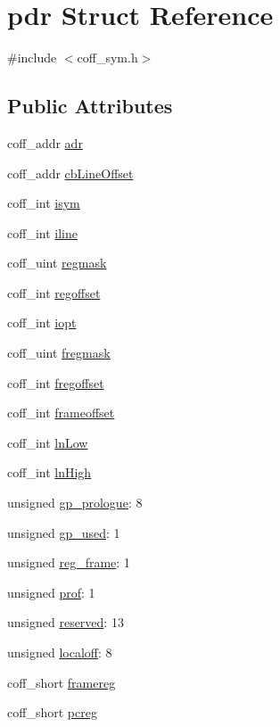\hypertarget{structpdr}{
\section{pdr Struct Reference}
\label{structpdr}
}


{\ttfamily \#include $<$coff\_\-sym.h$>$}

\subsection*{Public Attributes}
\begin{DoxyCompactItemize}
\item 
coff\_\-addr \hyperlink{structpdr_a9683304f0fe296f7a483bac5bd75068e}{adr}
\item 
coff\_\-addr \hyperlink{structpdr_add45eb5247cbbbf3ae585ab75dc46a88}{cbLineOffset}
\item 
coff\_\-int \hyperlink{structpdr_a96691b597c44dd0ccc301933c13c360e}{isym}
\item 
coff\_\-int \hyperlink{structpdr_a063f5b704e887eba6e920f485ccdcb55}{iline}
\item 
coff\_\-uint \hyperlink{structpdr_afc6a6366a22fbc15d07b8a9d7f131a7c}{regmask}
\item 
coff\_\-int \hyperlink{structpdr_a747789523b1f89a8031be811da4fb699}{regoffset}
\item 
coff\_\-int \hyperlink{structpdr_a09ea5e25012be8cb4a0499b59010e91c}{iopt}
\item 
coff\_\-uint \hyperlink{structpdr_a3ed6548a5447fbb82280230245a5970e}{fregmask}
\item 
coff\_\-int \hyperlink{structpdr_ac55e86e06de10940df4f9acd6c6daec5}{fregoffset}
\item 
coff\_\-int \hyperlink{structpdr_ac824eab7b6364b2ae3af8c6d7e38a2da}{frameoffset}
\item 
coff\_\-int \hyperlink{structpdr_ae1f3a2f18f84f0ca0b1ad622a3d9ee43}{lnLow}
\item 
coff\_\-int \hyperlink{structpdr_a5f962eddff2dc031ee8b26a543f63769}{lnHigh}
\item 
unsigned \hyperlink{structpdr_aeacab271a2368271fe4076dc80ba90e9}{gp\_\-prologue}: 8
\item 
unsigned \hyperlink{structpdr_ac8626261425805826c721849a66a76d7}{gp\_\-used}: 1
\item 
unsigned \hyperlink{structpdr_abaa973b1ecd9152fd9978532a7924a07}{reg\_\-frame}: 1
\item 
unsigned \hyperlink{structpdr_acfb0621563fe0b3473bef1f0d7922f73}{prof}: 1
\item 
unsigned \hyperlink{structpdr_a403af5a7dd48ca92af6aa1b47cf3b2b2}{reserved}: 13
\item 
unsigned \hyperlink{structpdr_af725ffc345192247fc3a1a69245b0f78}{localoff}: 8
\item 
coff\_\-short \hyperlink{structpdr_add996655f684759d34d998e71d5d0fb8}{framereg}
\item 
coff\_\-short \hyperlink{structpdr_ab0e42938f9e8b09feb4989d245a1c292}{pcreg}
\end{DoxyCompactItemize}


